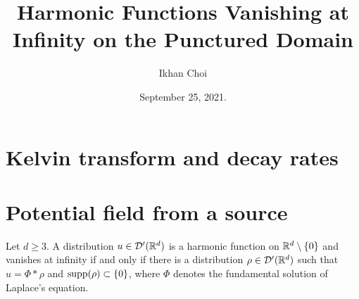 \documentclass[12pt]{article}
\title{Harmonic Functions Vanishing at Infinity on the Punctured Domain}
\author{Ikhan Choi}
\date{September 25, 2021.}
\begin{document}
\maketitle
\section{Kelvin transform and decay rates}

\section{Potential field from a source}


\begin{thm*}
Let $d\ge3$.
A distribution $u\in\mathcal{D}'(\mathbb{R}^d)$ is a harmonic function on $\mathbb{R}^d\setminus\{0\}$ and vanishes at infinity if and only if there is a distribution $\rho\in\mathcal{D}'(\mathbb{R}^d)$ such that $u=\Phi*\rho$ and $\operatorname{supp}(\rho)\subset\{0\}$, where $\Phi$ denotes the fundamental solution of Laplace's equation.
\end{thm*}
\end{document}
